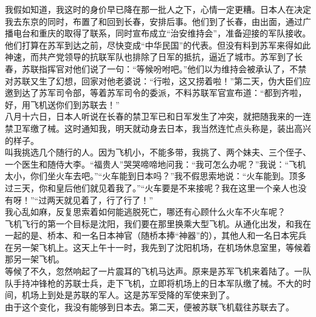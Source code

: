 我假如知道，我这时的身价早已降在那一批人之下，心情一定更糟。日本人在决定我去东京的同时，布置了和回到长春，安排后事。他们到了长春，由出面，通过广播电台和重庆的取得了联系，同时宣布成立“治安维持会”，准备迎接的军队接收。他们打算在苏军到达之前，尽快变成“中华民国”的代表。但没有料到苏军来得如此神速，而共产党领导的抗联军队也排除了日军的抵抗，逼近了城市。苏军到了长春，苏联指挥官对他们说了一句：“等候吩咐吧。”他们以为维持会被承认了，不禁对苏联又生了幻想，回家对他老婆说：“行啦，这又捞着啦！”第二天，伪大臣们应邀到达了苏军司令部，等着苏军司令的委派，不料苏联军官宣布道：“都到齐啦，好，用飞机送你们到苏联去！”\\

八月十六日，日本人听说在长春的禁卫军已和日军发生了冲突，就把随我来的一连禁卫军缴了械。这时通知我，明天就动身去日本，我当然连忙点头称是，装出高兴的样子。\\

叫我挑选几个随行的人。因为飞机小，不能多带，我挑了、两个妹夫、三个侄子、一个医生和随侍大李。“福贵人”哭哭啼啼地问我：“我可怎么办呢？”我说：“飞机太小，你们坐火车去吧。”“火车能到日本吗？”我不假思索地说：“火车能到。顶多过三天，你和皇后他们就见着我了。”“火车要是不来接呢？我在这里一个亲人也没有呀！”“过两天就见着了，行了行了！”\\

我心乱如麻，反复思索着如何能逃脱死亡，哪还有心顾什么火车不火车呢？\\

飞机飞行的第一个目标是沈阳，我们要在那里换乘大型飞机。从通化出发，和我在一起的是、桥本、和一名日本神官（随桥本捧“神器”的），其他人和一名日本宪兵在另一架飞机上。这天上午十一时，我先到了沈阳机场，在机场休息室里，等候着那另一架飞机。\\

等候了不久，忽然响起了一片震耳的飞机马达声。原来是苏军飞机来着陆了。一队队手持冲锋枪的苏联士兵，走下飞机，立即将机场上的日本军队缴了械。不大的时间，机场上到处是苏联的军人。这是苏军受降的军使来到了。\\

由于这个变化，我没有能够到日本去。第二天，便被苏联飞机载往苏联去了。
